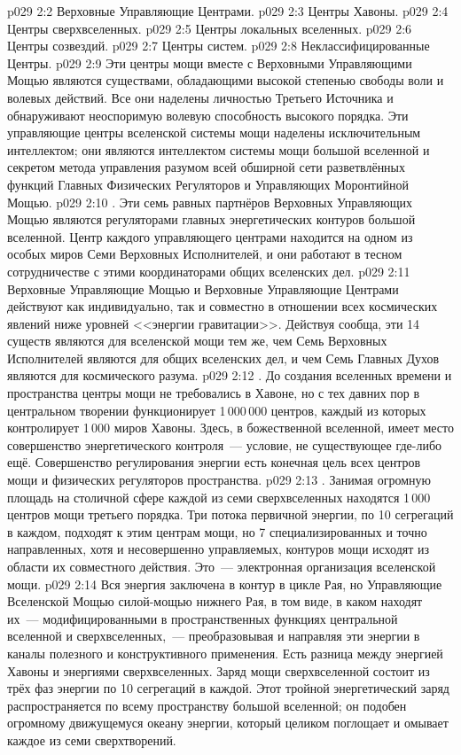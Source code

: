\vs p029 2:2 Верховные Управляющие Центрами.
\vs p029 2:3 Центры Хавоны.
\vs p029 2:4 Центры сверхвселенных.
\vs p029 2:5 Центры локальных вселенных.
\vs p029 2:6 Центры созвездий.
\vs p029 2:7 Центры систем.
\vs p029 2:8 Неклассифицированные Центры.
\vs p029 2:9 \pc Эти центры мощи вместе с Верховными Управляющими Мощью являются существами, обладающими высокой степенью свободы воли и волевых действий. Все они наделены личностью Третьего Источника и обнаруживают неоспоримую волевую способность высокого порядка. Эти управляющие центры вселенской системы мощи наделены исключительным интеллектом; они являются интеллектом системы мощи большой вселенной и секретом метода управления разумом всей обширной сети разветвлённых функций Главных Физических Регуляторов и Управляющих Моронтийной Мощью.
\vs p029 2:10 . Эти семь равных партнёров Верховных Управляющих Мощью являются регуляторами главных энергетических контуров большой вселенной. Центр каждого управляющего центрами находится на одном из особых миров Семи Верховных Исполнителей, и они работают в тесном сотрудничестве с этими координаторами общих вселенских дел.
\vs p029 2:11 Верховные Управляющие Мощью и Верховные Управляющие Центрами действуют как индивидуально, так и совместно в отношении всех космических явлений ниже уровней <<энергии гравитации>>. Действуя сообща, эти 14 существ являются для вселенской мощи тем же, чем Семь Верховных Исполнителей являются для общих вселенских дел, и чем Семь Главных Духов являются для космического разума.
\vs p029 2:12 . До создания вселенных времени и пространства центры мощи не требовались в Хавоне, но с тех давних пор в центральном творении функционирует 1\,000\,000 центров, каждый из которых контролирует 1\,000 миров Хавоны. Здесь, в божественной вселенной, имеет место совершенство энергетического контроля~--- условие, не существующее где\hyp{}либо ещё. Совершенство регулирования энергии есть конечная цель всех центров мощи и физических регуляторов пространства.
\vs p029 2:13 . Занимая огромную площадь на столичной сфере каждой из семи сверхвселенных находятся 1\,000 центров мощи третьего порядка. Три потока первичной энергии, по 10 сегрегаций в каждом, подходят к этим центрам мощи, но 7 специализированных и точно направленных, хотя и несовершенно управляемых, контуров мощи исходят из области их совместного действия. Это~--- электронная организация вселенской мощи.
\vs p029 2:14 Вся энергия заключена в контур в цикле Рая, но Управляющие Вселенской Мощью  силой\hyp{}мощью нижнего Рая, в том виде, в каком находят их~--- модифицированными в пространственных функциях центральной вселенной и сверхвселенных,~--- преобразовывая и направляя эти энергии в каналы полезного и конструктивного применения. Есть разница между энергией Хавоны и энергиями сверхвселенных. Заряд мощи сверхвселенной состоит из трёх фаз энергии по 10 сегрегаций в каждой. Этот тройной энергетический заряд распространяется по всему пространству большой вселенной; он подобен огромному движущемуся океану энергии, который целиком поглощает и омывает каждое из семи сверхтворений.
